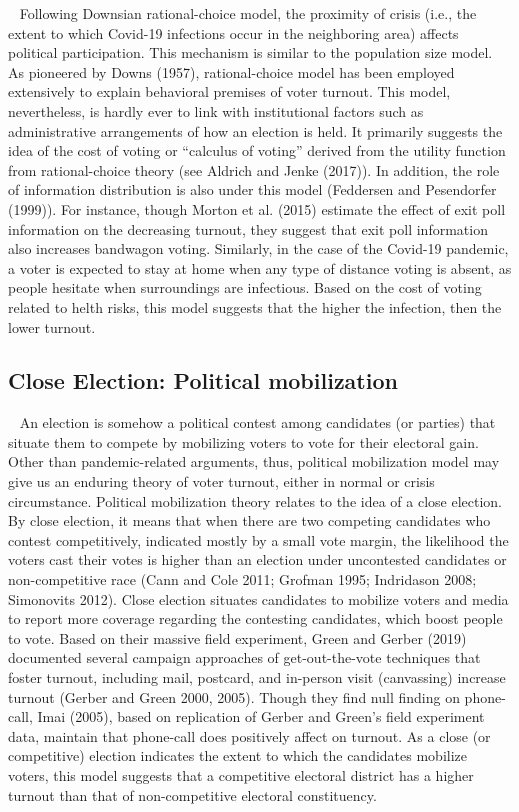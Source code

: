 \documentclass[
  12pt,
]{article}
\begin{document}
~ Following Downsian rational-choice model, the proximity of crisis
(i.e., the extent to which Covid-19 infections occur in the neighboring
area) affects political participation. This mechanism is similar to the
population size model. As pioneered by Downs (1957), rational-choice
model has been employed extensively to explain behavioral premises of
voter turnout. This model, nevertheless, is hardly ever to link with
institutional factors such as administrative arrangements of how an
election is held. It primarily suggests the idea of the cost of voting
or ``calculus of voting'' derived from the utility function from
rational-choice theory (see Aldrich and Jenke (2017)). In addition, the
role of information distribution is also under this model (Feddersen and
Pesendorfer (1999)). For instance, though Morton et al. (2015) estimate
the effect of exit poll information on the decreasing turnout, they
suggest that exit poll information also increases bandwagon voting.
Similarly, in the case of the Covid-19 pandemic, a voter is expected to
stay at home when any type of distance voting is absent, as people
hesitate when surroundings are infectious. Based on the cost of voting
related to helth risks, this model suggests that the higher the
infection, then the lower turnout.

\hypertarget{close-election-political-mobilization}{%
\subsection{Close Election: Political
mobilization}\label{close-election-political-mobilization}}

~ An election is somehow a political contest among candidates (or
parties) that situate them to compete by mobilizing voters to vote for
their electoral gain. Other than pandemic-related arguments, thus,
political mobilization model may give us an enduring theory of voter
turnout, either in normal or crisis circumstance. Political mobilization
theory relates to the idea of a close election. By close election, it
means that when there are two competing candidates who contest
competitively, indicated mostly by a small vote margin, the likelihood
the voters cast their votes is higher than an election under uncontested
candidates or non-competitive race (Cann and Cole 2011; Grofman 1995;
Indridason 2008; Simonovits 2012). Close election situates candidates to
mobilize voters and media to report more coverage regarding the
contesting candidates, which boost people to vote. Based on their
massive field experiment, Green and Gerber (2019) documented several
campaign approaches of get-out-the-vote techniques that foster turnout,
including mail, postcard, and in-person visit (canvassing) increase
turnout (Gerber and Green 2000, 2005). Though they find null finding on
phone-call, Imai (2005), based on replication of Gerber and Green's
field experiment data, maintain that phone-call does positively affect
on turnout. As a close (or competitive) election indicates the extent to
which the candidates mobilize voters, this model suggests that a
competitive electoral district has a higher turnout than that of
non-competitive electoral constituency.
\end{document}

